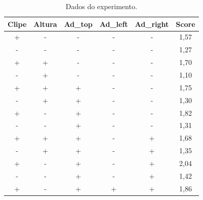 \begin{table}[H]
  \centering
  \caption{Dados do experimento.}
  \begin{tabular}{|c|c|c|c|c|c|}
  \hline
  \rowcolor[HTML]{EFEFEF} 
  \textbf{Clipe} & \textbf{Altura} & \textbf{Ad\_top} & \textbf{Ad\_left} & \textbf{Ad\_right} & \textbf{Score} \\ \hline
  +              & -               & -                & -                 & -                  & 1,57           \\ \hline
  \rowcolor[HTML]{EFEFEF} 
  -              & -               & -                & -                 & -                  & 1,27           \\ \hline
  +              & +               & -                & -                 & -                  & 1,70           \\ \hline
  \rowcolor[HTML]{EFEFEF} 
  -              & +               & -                & -                 & -                  & 1,10           \\ \hline
  +              & +               & +                & -                 & -                  & 1,75           \\ \hline
  \rowcolor[HTML]{EFEFEF} 
  -              & +               & +                & -                 & -                  & 1,30           \\ \hline
  +              & -               & +                & -                 & -                  & 1,82           \\ \hline
  \rowcolor[HTML]{EFEFEF} 
  -              & -               & +                & -                 & -                  & 1,31           \\ \hline
  +              & +               & +                & -                 & +                  & 1,68           \\ \hline
  \rowcolor[HTML]{EFEFEF} 
  -              & +               & +                & -                 & +                  & 1,35           \\ \hline
  +              & -               & +                & -                 & +                  & 2,04           \\ \hline
  \rowcolor[HTML]{EFEFEF} 
  -              & -               & +                & -                 & +                  & 1,42           \\ \hline
  +              & -               & +                & +                 & +                  & 1,86           \\ \hline

\end{tabular}
\end{table}
